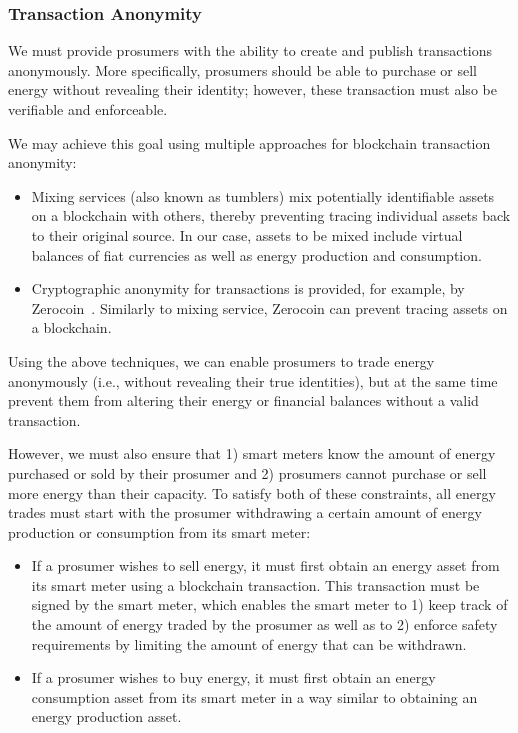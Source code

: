 \subsubsection{Transaction Anonymity}
We must provide prosumers with the ability to create and publish transactions anonymously.
More specifically, prosumers should be able to purchase or sell energy without revealing their identity; however, these transaction must also be verifiable and enforceable.

We may achieve this goal using multiple approaches for blockchain transaction anonymity:
\begin{itemize}
\item Mixing services (also known as tumblers) mix potentially identifiable assets on a blockchain with others, thereby preventing tracing individual assets back to their original source. 
In our case, assets to be mixed include virtual balances of fiat currencies as well as energy production and consumption.
\item Cryptographic anonymity for transactions is provided, for example, by Zerocoin~\cite{miers2013zerocoin}. Similarly to mixing service, Zerocoin can prevent tracing assets on a blockchain.
\end{itemize}
Using the above techniques, we can enable prosumers to trade energy anonymously (i.e., without revealing their true identities), but at the same time prevent them from altering their energy or financial balances without a valid transaction.

However, we must also ensure that 1) smart meters know the amount of energy purchased or sold by their prosumer and 2) prosumers cannot purchase or sell more energy than their capacity.
To satisfy both of these constraints, all energy trades must start with the prosumer withdrawing a certain amount of energy production or consumption from its smart meter:
\begin{itemize}
\item If a prosumer wishes to sell energy, it must first obtain an energy asset from its smart meter using a blockchain transaction.
This transaction must be signed by the smart meter, which enables the smart meter to 1) keep track of the amount of energy traded by the prosumer as well as to 2) enforce safety requirements by limiting the amount of energy that can be withdrawn.
\item If a prosumer wishes to buy energy, it must first obtain an energy consumption asset from its smart meter in a way similar to obtaining an energy production asset.
\end{itemize}

